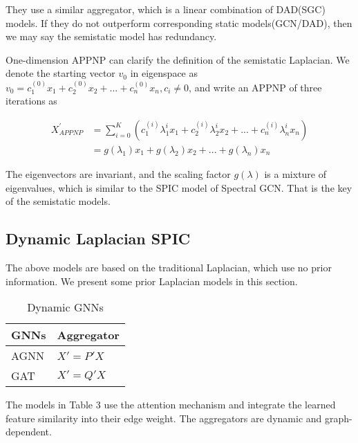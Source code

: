 \documentclass[preprint,11pt]{elsarticle}
\begin{document}
They use a similar aggregator, which is a linear combination of DAD(SGC) models. If they do not outperform corresponding static models(GCN/DAD), then we may say the semistatic model has redundancy.

One-dimension APPNP can clarify the definition of the semistatic Laplacian. We denote the starting vector $v_0$ in eigenspace as $v_0 = c_1^{(0)}x_1 + c_2^{(0)}x_2+...+c_n^{(0)}x_n, c_i \ne 0$, and write an APPNP of three iterations as
\begin{small}
\begin{equation}
\begin{split}
X_{APPNP}^{'} &= \sum_{i=0}^{K} (c_1^{(i)}\lambda_{1}^{i} x_1 + c_2^{(i)}\lambda_{2}^{i} x_2+...+c_n^{(i)}\lambda_{n}^{i} x_n)\\
& = g(\lambda_{1})x_1 + g(\lambda_{2})x_2 + ... +g(\lambda_{n})x_n
\end{split}
\end{equation}
\end{small}

The eigenvectors are invariant, and the scaling factor $g(\lambda)$ is a mixture of eigenvalues, which is similar to the SPIC model of Spectral GCN. That is the key of the semistatic models.

\subsection{Dynamic Laplacian SPIC}

The above models are based on the traditional Laplacian, which use no prior information. We present some prior Laplacian models in this section.
\begin{table}
\setlength{\abovecaptionskip}{0pt}
\setlength{\belowcaptionskip}{6pt}
  \caption{Dynamic GNNs}
  \label{table-3}
  \centering
  \begin{tabular}{ll}
    \toprule 
    \quad  GNNs \quad\quad     & \quad \quad Aggregator  \\
    \midrule
    AGNN  \cite{ref23} \quad\quad & \quad\quad $X' = P'X$ \quad \\
    GAT  \cite{ref24} \quad\quad     & \quad\quad $X' = Q'X$ \quad  \\
    \bottomrule
  \end{tabular}
\end{table}
The models in Table 3 use the attention mechanism and integrate the learned feature similarity into their edge weight. The aggregators are dynamic and graph-dependent.
\end{document}
